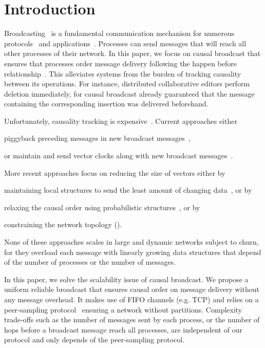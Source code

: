 
\section{Introduction}


Broadcasting~\cite{hadzilacos1994modular} is a fundamental communication
mechanism for numerous
protocols~\cite{nakamoto2009bitcoin,shapiro2011comprehensive} and
applications~\cite{nedelec2016crate}. Processes can send messages that will
reach all other processes of their network. In this paper, we focus on causal
broadcast that ensures that processes order message delivery following the
happen before relationship~\cite{lamport1978time}. This alleviates systems from
the burden of tracking causality between its operations. For instance,
distributed collaborative editors perform deletion immediately, for causal
broadcast already guaranteed that the message containing the corresponding
insertion was delivered beforehand.

Unfortunately, causality tracking is
expensive~\cite{charronbost1991concerning}. Current approaches either
\begin{inparaenum}[(i)]
\item piggyback preceding messages in new broadcast
  messages~\cite{birman1987reliable,hadzilacos1993fault},
\item or maintain and send vector clocks along with new broadcast
  messages~\cite{fidge1988timestamps,mattern1989virtual}.
\end{inparaenum}
More recent approaches focus on reducing the size of vectors either by
\begin{inparaenum}[(a)]
\item maintaining local structures to send the least amount of changing
  data~\cite{singhal1992efficient}, or by
\item relaxing the causal order using probabilistic
  structures~\cite{mostefaoui2017probabilistic}, or by
\item constraining the network topology (\REF).
\end{inparaenum}
None of these approaches scales in large and dynamic networks subject to churn,
for they overload each message with linearly growing data structures that depend
of the number of processes or the number of messages.

In this paper, we solve the scalability issue of causal broadcast. We propose a
uniform reliable broadcast that ensures causal order on message delivery without
any message overhead.  It makes use of FIFO channels (e.g. TCP) and relies on a
peer-sampling protocol~\cite{jelasity2007gossip} ensuring a network without
partitions.  Complexity trade-offs such as the number of messages sent by each
process, or the number of hops before a broadcast message reach all processes,
are independent of our protocol and only depends of the peer-sampling protocol.

